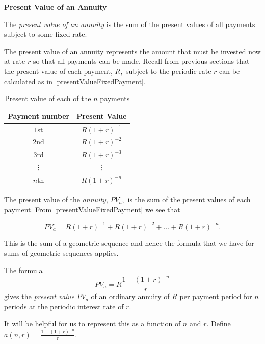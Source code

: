 
\textbf{Present Value of an Annuity}

\begin{definition}
    The \emph{present value of an annuity} is the sum of the present values of all payments subject to some fixed rate.
\end{definition}

The present value of an annuity represents the amount that must be invested now at rate \(r\) so that all payments can be made.
Recall from previous sections that the present value of each payment, \(R,\) subject to the periodic rate \(r\) can be calculated as in \autoref{presentValueFixedPayment}. 

\begin{table}[]
    \centering
    \begin{tabular}{c|c}
         Payment number & Present Value \\ \hline
         \(1\)st & \(R\left(1+r\right)^{-1}\) \\
         \(2\)nd & \(R\left(1+r\right)^{-2}\) \\
         \(3\)rd & \(R\left(1+r\right)^{-3}\) \\
         \vdots & \vdots \\
         \(n\)th & \(R\left(1+r\right)^{-n}\) \\
    \end{tabular}
    \caption{Present value of each of the \(n\) payments}
    \label{presentValueFixedPayment}
\end{table}

The present value of the \emph{annuity}, \(PV_a,\) is the sum of the present values of each payment. From \autoref{presentValueFixedPayment} we see that 

\[PV_a = R\left(1+r\right)^{-1} + R\left(1+r\right)^{-2} + \dots + R\left(1+r\right)^{-n}.\]

This is the sum of a geometric sequence and hence the formula that we have for sums of geometric sequences applies.

\begin{definition}
    The formula
    \[PV_a = R\frac{1-\left(1+r\right)^{-n}}{r}\]
    gives the \emph{present value} \(PV_a\) of an ordinary annuity of \(R\) per payment period for \(n\) periods at the periodic interest rate of \(r.\)
\end{definition}

It will be helpful for us to represent this as a function of \(n\) and \(r.\) Define \(a\left(n,r\right) = \frac{1-\left(1+r\right)^{-n}}{r}.\)